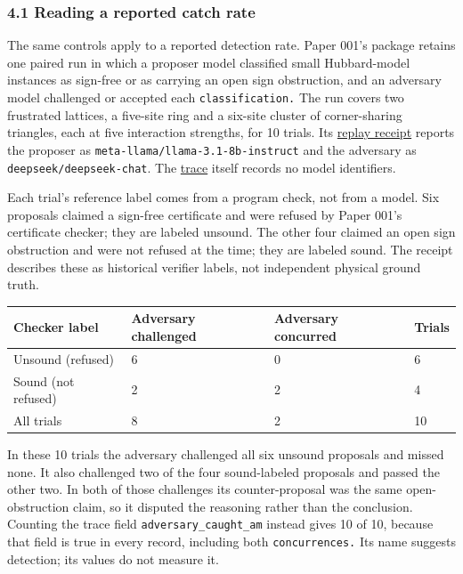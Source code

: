 \documentclass[
  11pt,
]{article}
\begin{document}
\subsubsection{4.1 Reading a reported catch
rate}\label{reading-a-reported-catch-rate}

The same controls apply to a reported detection rate. Paper 001's
package retains one paired run in which a proposer model classified
small Hubbard-model instances as sign-free or as carrying an open sign
obstruction, and an adversary model challenged or accepted each
\nolinkurl{classification.} The run covers two frustrated lattices, a
five-site ring and a six-site cluster of corner-sharing triangles, each
at five interaction strengths, for 10 trials. Its
\href{https://github.com/dbccpage/the_symbol_game/blob/593230f7daba7aa04d7c41dd456dfbd00a39bcbd/omega_engine_atlas/coda_atlas/omega_engine_pfp/001_pfp_discrete_cochain_retraction_and_toy_involutions/results/demo2_r7_adversarial_debate_receipt.json}{replay
receipt} reports the proposer as
\nolinkurl{meta-llama/llama-3.1-8b-instruct} and the adversary as
\nolinkurl{deepseek/deepseek-chat}. The
\href{https://github.com/dbccpage/the_symbol_game/blob/593230f7daba7aa04d7c41dd456dfbd00a39bcbd/omega_engine_atlas/coda_atlas/omega_engine_pfp/001_pfp_discrete_cochain_retraction_and_toy_involutions/results/demo2_r7_adversarial_debate_1790210039.jsonl}{trace}
itself records no model identifiers.

Each trial's reference label comes from a program check, not from a
model. Six proposals claimed a sign-free certificate and were refused by
Paper 001's certificate checker; they are labeled unsound. The other
four claimed an open sign obstruction and were not refused at the time;
they are labeled sound. The receipt describes these as historical
verifier labels, not independent physical ground truth.

\begin{longtable}[]{@{}llll@{}}
\toprule\noalign{}
Checker label & Adversary challenged & Adversary concurred & Trials \\
\midrule\noalign{}
\endhead
\bottomrule\noalign{}
\endlastfoot
Unsound (refused) & 6 & 0 & 6 \\
Sound (not refused) & 2 & 2 & 4 \\
All trials & 8 & 2 & 10 \\
\end{longtable}

In these 10 trials the adversary challenged all six unsound proposals
and missed none. It also challenged two of the four sound-labeled
proposals and passed the other two. In both of those challenges its
counter-proposal was the same open-obstruction claim, so it disputed the
reasoning rather than the conclusion. Counting the trace field
\nolinkurl{adversary_caught_am} instead gives 10 of 10, because that
field is true in every record, including both \nolinkurl{concurrences.}
Its name suggests detection; its values do not measure it.
\end{document}
